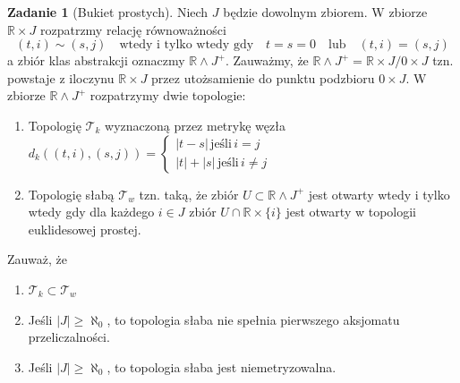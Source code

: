 \documentclass{article}
\theoremstyle{definition}%
\theoremstyle{theorem}
\newtheorem{zad}{Zadanie}
\newcommand{\R}{\mathbb{R}} %
\newcommand{\sT}{\mathcal{T}} %
\begin{document}
	\begin{zad} [Bukiet prostych] Niech $J$ będzie dowolnym zbiorem. W zbiorze $\R\times J$ rozpatrzmy relację równoważności $$(t,i)\sim (s,j)\quad\text{wtedy i tylko wtedy gdy}\quad t=s=0\quad\text{lub} \quad (t,i) = (s,j)$$ a zbiór klas abstrakcji oznaczmy  $\R\wedge J^+$. Zauważmy, że $\R\wedge J^+ = \R\times J/0\times J$ tzn. powstaje z iloczynu  $\R\times J$ przez utożsamienie do punktu podzbioru $0\times J$. W zbiorze $\R\wedge J^+$ rozpatrzymy dwie topologie:
		\begin{enumerate} 
			\item Topologię $\sT_k$ wyznaczoną przez metrykę węzła $d_k((t,i),(s,j)) = \begin{cases}  |t-s|\, \text{jeśli}\, i=j \\ |t|+|s|\, \text{jeśli}\, i\neq j\end{cases}$
			
			\item Topologię słabą $\sT_w$  tzn. taką, że zbiór $U\subset \R\wedge J^+$ jest otwarty wtedy i tylko wtedy gdy dla każdego $i\in J$ zbiór $U\cap \R\times\{i\}$ jest otwarty w topologii euklidesowej prostej. 
		\end{enumerate}
		Zauważ, że 
		\begin{enumerate}
			\item $\sT_k\subset \sT_w$
			\item Jeśli $|J|\geq \aleph_0$, to topologia słaba nie spełnia pierwszego aksjomatu przeliczalności.
			\item Jeśli $|J|\geq \aleph_0$, to topologia słaba jest niemetryzowalna.
		\end{enumerate} 
		 \end{zad}
\end{document}

